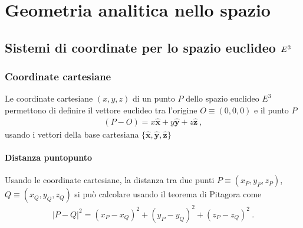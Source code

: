 \documentclass[letterpaper,10pt,english]{jupyterBook}
\begin{document}
\sphinxAtStartPar
{}

\sphinxstepscope


\chapter{Geometria analitica nello spazio}
\label{\detokenize{ch/analytic_geometry/analytic_geometry_3d:geometria-analitica-nello-spazio}}\label{\detokenize{ch/analytic_geometry/analytic_geometry_3d:geometry-analytic-3d}}\label{\detokenize{ch/analytic_geometry/analytic_geometry_3d::doc}}
\sphinxstepscope


\section{Sistemi di coordinate per lo spazio euclideo \protect\(E^3\protect\)}
\label{\detokenize{ch/analytic_geometry/analytic_geometry_3d/points:sistemi-di-coordinate-per-lo-spazio-euclideo-e-3}}\label{\detokenize{ch/analytic_geometry/analytic_geometry_3d/points:geometry-analytic-3d-points}}\label{\detokenize{ch/analytic_geometry/analytic_geometry_3d/points::doc}}

\subsection{Coordinate cartesiane}
\label{\detokenize{ch/analytic_geometry/analytic_geometry_3d/points:coordinate-cartesiane}}
\sphinxAtStartPar
Le coordinate cartesiane \((x,y,z)\) di un punto \(P\) dello spazio euclideo \(E^3\) permettono di definire il vettore euclideo tra l’origine \(O \equiv (0,0,0)\) e il punto \(P\)
\begin{equation*}
\begin{split}(P-O) = x \hat{\mathbf{x}} + y \hat{\mathbf{y}} + z \hat{\mathbf{z}} \ ,\end{split}
\end{equation*}
\sphinxAtStartPar
usando i vettori della base cartesiana \(\{\hat{\mathbf{x}}, \hat{\mathbf{y}}, \hat{\mathbf{z}} \}\)


\subsubsection{Distanza punto\sphinxhyphen{}punto}
\label{\detokenize{ch/analytic_geometry/analytic_geometry_3d/points:distanza-punto-punto}}
\sphinxAtStartPar
Usando le coordinate cartesiane, la distanza tra due punti \(P \equiv(x_P, y_P, z_P)\), \(Q \equiv (x_Q, y_Q, z_Q)\) si può calcolare usando il teorema di Pitagora come
\begin{equation*}
\begin{split}|P-Q|^2 = (x_P - x_Q)^2 + (y_P - y_Q)^2 + (z_P - z_Q)^2 \ .\end{split}
\end{equation*}
\end{document}
